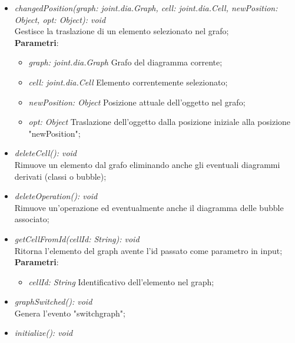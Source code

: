 \documentclass[../DefinizioneDiProdotto.tex]{subfiles}
\begin{document}
\begin{itemize}
\begin{itemize}
							\item \emph{changedPosition(graph: joint.dia.Graph, cell: joint.dia.Cell, newPosition: Object, opt: Object): void} \\
							Gestisce la traslazione di un elemento selezionato nel grafo; \\
								\textbf{Parametri}:
								\begin{itemize}
									\item \emph{graph: joint.dia.Graph}
									Grafo del diagramma corrente; \\
									\item \emph{cell: joint.dia.Cell}
									Elemento correntemente selezionato; \\
									\item \emph{newPosition: Object}
									Posizione attuale dell'oggetto nel grafo; \\
									\item \emph{opt: Object}
									Traslazione dell'oggetto dalla posizione iniziale alla posizione "newPosition"; \\
								\end{itemize}
							\item \emph{deleteCell(): void} \\
							Rimuove un elemento dal grafo eliminando anche gli eventuali diagrammi derivati (classi o bubble); \\
							\item \emph{deleteOperation(): void} \\
							Rimuove un'operazione ed eventualmente anche il diagramma delle bubble associato; \\
							\item \emph{getCellFromId(cellId: String): void} \\
							Ritorna l'elemento del graph avente l'id passato come parametro in input; \\
								\textbf{Parametri}:
								\begin{itemize}
									\item \emph{cellId: String}
									Identificativo dell'elemento nel graph; \\
								\end{itemize}
							\item \emph{graphSwitched(): void} \\
							Genera l'evento "switchgraph"; \\
							\item \emph{initialize(): void} \\

\end{itemize}
\end{itemize}
\end{document}
